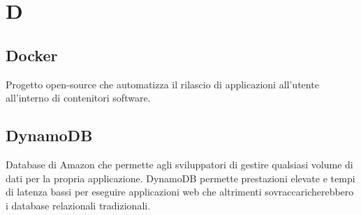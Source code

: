 \section*{D}
\markright{}
\subsection*{Docker}
Progetto open-source che automatizza il rilascio di applicazioni all'utente all'interno di contenitori software.
\subsection*{DynamoDB}
Database  di Amazon che permette agli sviluppatori di gestire qualsiasi volume di dati per la propria applicazione. DynamoDB permette prestazioni elevate e tempi di latenza bassi per eseguire applicazioni web che altrimenti sovraccaricherebbero i database relazionali tradizionali.
